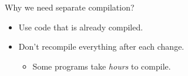 \documentclass[xcolor={usenames,dvipsnames}]{beamer}
\begin{document}
\begin{frame}{Why we need separate compilation?}
\begin{itemize}
    \item  Use code that is already compiled.
    \item  Don't recompile everything after each change.

    \begin{itemize}
        \item  Some programs take \emph{hours} to compile.
    \end{itemize}
    
\end{itemize}

\end{frame}
% 
\end{document}
